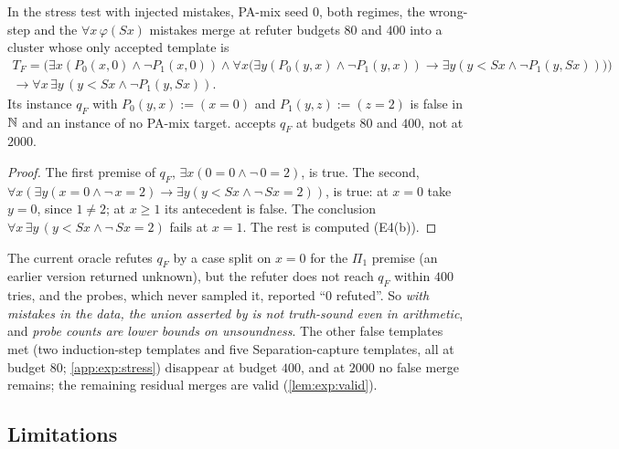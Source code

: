 \begin{proposition}\label{prop:exp:qF}
In the stress test with injected mistakes, PA-mix seed $0$, both regimes, the wrong-step and the $\forall x\,\varphi(Sx)$ mistakes merge at refuter budgets $80$ and $400$ into a cluster whose only accepted template is
\begin{multline*}T_F=\bigl(\exists x(P_0(x,0)\wedge\neg P_1(x,0))\wedge\forall x\bigl(\exists y(P_0(y,x)\wedge\neg P_1(y,x))\to\exists y(y<Sx\wedge\neg P_1(y,Sx))\bigr)\bigr)\\\to\forall x\,\exists y\,(y<Sx\wedge\neg P_1(y,Sx)).\end{multline*}
Its instance $q_F$ with $P_0(y,x):=(x=0)$ and $P_1(y,z):=(z=2)$ is false in $\mathbb{N}$ and an instance of no PA-mix target. \textup{\DTRC{}} accepts $q_F$ at budgets $80$ and $400$, not at $2000$.
\end{proposition}

\begin{proof}
The first premise of $q_F$, $\exists x(0=0\wedge\neg\,0=2)$, is true. The second, $\forall x(\exists y(x=0\wedge\neg\,x=2)\to\exists y(y<Sx\wedge\neg\,Sx=2))$, is true: at $x=0$ take $y=0$, since $1\neq2$; at $x\ge1$ its antecedent is false. The conclusion $\forall x\,\exists y\,(y<Sx\wedge\neg\,Sx=2)$ fails at $x=1$. The rest is computed (E4(b)).
\end{proof}

The current oracle refutes $q_F$ by a case split on $x=0$ for the $\Pi_1$ premise (an earlier version returned unknown), but the refuter does not reach $q_F$ within $400$ tries, and the probes, which never sampled it, reported ``$0$ refuted''. So \emph{with mistakes in the data, the union asserted by \textup{\DTRC{}} is not truth-sound even in arithmetic}, and \emph{probe counts are lower bounds on unsoundness}. The other false templates met (two induction-step templates and five Separation-capture templates, all at budget $80$; \cref{app:exp:stress}) disappear at budget $400$, and at $2000$ no false merge remains; the remaining residual merges are valid (\cref{lem:exp:valid}).

\subsection{Limitations}\label{sec:exp:limits}

